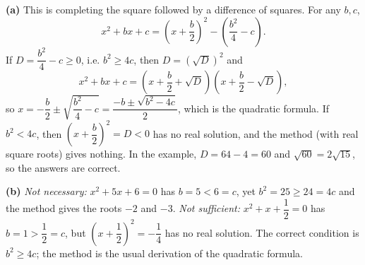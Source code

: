 \textbf{(a)} This is completing the square followed by a difference of squares. For any $b,c$,
\[
x^2+bx+c=\left(x+\dfrac{b}{2}\right)^2-\left(\dfrac{b^2}{4}-c\right).
\]
If $D=\dfrac{b^2}{4}-c\ge0$, i.e. $b^2\ge4c$, then $D=\left(\sqrt D\right)^2$ and
\[
x^2+bx+c=\left(x+\dfrac{b}{2}+\sqrt D\right)\left(x+\dfrac{b}{2}-\sqrt D\right),
\]
so $x=-\dfrac{b}{2}\pm\sqrt{\dfrac{b^2}{4}-c}=\dfrac{-b\pm\sqrt{b^2-4c}}{2}$, which is the quadratic formula. If $b^2<4c$, then $\left(x+\dfrac{b}{2}\right)^2=D<0$ has no real solution, and the method (with real square roots) gives nothing. In the example, $D=64-4=60$ and $\sqrt{60}=2\sqrt{15}$, so the answers are correct.

\textbf{(b)} \emph{Not necessary:} $x^2+5x+6=0$ has $b=5<6=c$, yet $b^2=25\ge24=4c$ and the method gives the roots $-2$ and $-3$. \emph{Not sufficient:} $x^2+x+\dfrac{1}{2}=0$ has $b=1>\dfrac{1}{2}=c$, but $\left(x+\dfrac{1}{2}\right)^2=-\dfrac{1}{4}$ has no real solution. The correct condition is $b^2\ge4c$; the method is the usual derivation of the quadratic formula.
